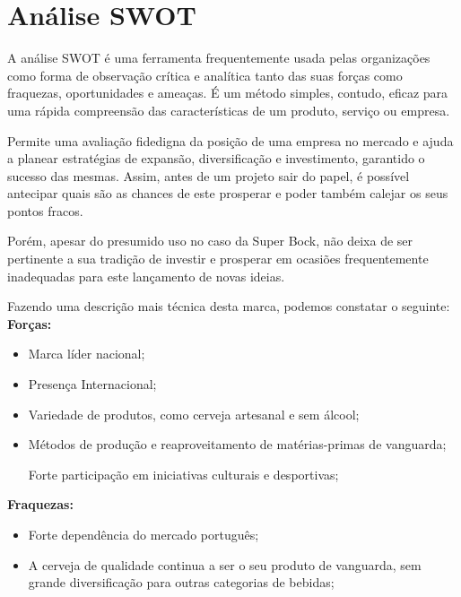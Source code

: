 \section{Análise SWOT}

A análise SWOT é uma ferramenta frequentemente usada pelas organizações como forma de observação crítica e analítica tanto das suas forças como fraquezas, oportunidades e ameaças. É um método simples, contudo, eficaz para uma rápida compreensão das características de um produto, serviço ou empresa. 

Permite uma avaliação fidedigna da posição de uma empresa no mercado e ajuda a planear estratégias de expansão, diversificação e investimento, garantido o sucesso das mesmas. Assim, antes de um projeto sair do papel, é possível antecipar quais são as chances de este prosperar e poder também calejar os seus pontos fracos. 

Porém, apesar do presumido uso no caso da Super Bock, não deixa de ser pertinente a sua tradição de investir e prosperar em ocasiões frequentemente inadequadas para este lançamento de novas ideias. 

Fazendo uma descrição mais técnica desta marca, podemos constatar o seguinte:\\

\noindent \textbf{Forças:}
\begin{itemize}
    
    \item Marca líder nacional; 

    \item Presença Internacional; 

    \item Variedade de produtos, como cerveja artesanal e sem álcool; 

    \item Métodos de produção e reaproveitamento de matérias-primas de vanguarda; 

Forte participação em iniciativas culturais e desportivas; 
\end{itemize}

\noindent \textbf{Fraquezas:} 
\begin{itemize}

\item Forte dependência do mercado português; 

\item A cerveja de qualidade continua a ser o seu produto de vanguarda, sem grande diversificação para outras categorias de bebidas; 
\end{itemize}

